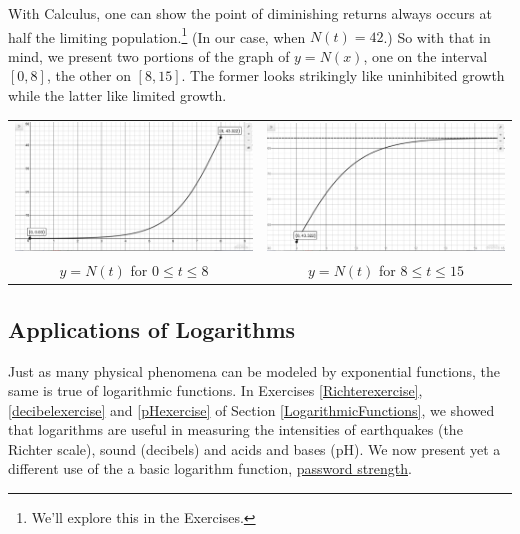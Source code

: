 \documentclass{ximera}
\begin{document}
\smallskip

With Calculus, one can show the point of diminishing returns always occurs at half the limiting population.\footnote{We'll explore this in the Exercises.}  (In our case, when $N(t)=42$.)  So with that in mind, we present two portions of the graph of $y=N(x)$, one on the interval $[0,8]$, the other on $[8,15]$. The former looks strikingly like uninhibited growth while the latter like limited growth.

\begin{center}

\begin{tabular}{cc}

\includegraphics[width=3in]{./ApplicationsofExponentialandLogarithmicFunctionsGraphics/ExpLogAppEx02.jpg} &

\includegraphics[width=3in]{./ApplicationsofExponentialandLogarithmicFunctionsGraphics/ExpLogAppEx03.jpg} \\

$y = N(t)$ for $0 \leq t \leq 8$ &

$y = N(t)$ for $8 \leq t \leq 15$

\end{tabular}

\end{center}


\subsection{Applications of Logarithms}

Just as many physical phenomena can be modeled by exponential functions, the same is true of logarithmic functions.   In Exercises \ref{Richterexercise},  \ref{decibelexercise} and \ref{pHexercise} of Section \ref{LogarithmicFunctions}, we showed that logarithms are useful in measuring the intensities of earthquakes (the Richter scale), sound (decibels) and acids and bases (pH).  We now present yet a different use of the a basic logarithm function, \href{http://en.wikipedia.org/wiki/Password_strength}{\underline{password strength}}.
\end{document}
